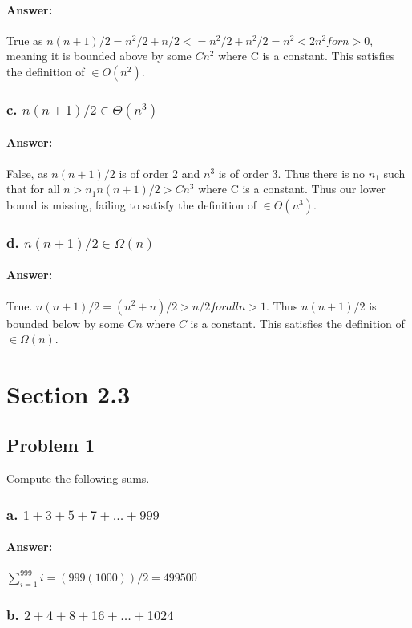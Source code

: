 \documentclass{article}
\begin{document}
    \paragraph{Answer:}
      True as $n(n+1)/2 = n^2/2 + n/2 <= n^2/2 + n^2/2 = n^2 < 2n^2 for n>0$, meaning it is bounded above by some $Cn^2$ where C is a constant. This satisfies the definition of $\in O(n^2)$.
  \subsubsection{c. $n(n + 1)/2 \in \Theta(n^3 )$}
    \paragraph{Answer:}
      False, as $n(n+1)/2$ is of order 2 and $n^3$ is of order 3. Thus there is no $n_{1}$ such that
      for all $n>n_{1} n(n+1)/2 > Cn^3$ where C is a constant. Thus our lower bound is missing, failing to satisfy the definition of $\in \Theta(n^3)$.
  \subsubsection{d. $n(n + 1)/2 \in \Omega(n)$}
    \paragraph{Answer:}
      True. $n(n+1)/2 = (n^2+n)/2 > n/2 for all n>1$. Thus $n(n+1)/2$ is bounded below by some $Cn$ where $C$ is a constant. This satisfies the definition of $\in \Omega(n)$.
\section{Section 2.3}
  \subsection{Problem 1}
    Compute the following sums.
  \subsubsection{a. $1 + 3 + 5 + 7 + . . . + 999$}
    \paragraph{Answer:}
      $\sum\limits_{i=1}^{999}i = (999(1000))/2 = 499500$
  \subsubsection{b. $2 + 4 + 8 + 16 + . . . + 1024$}
\end{document}

